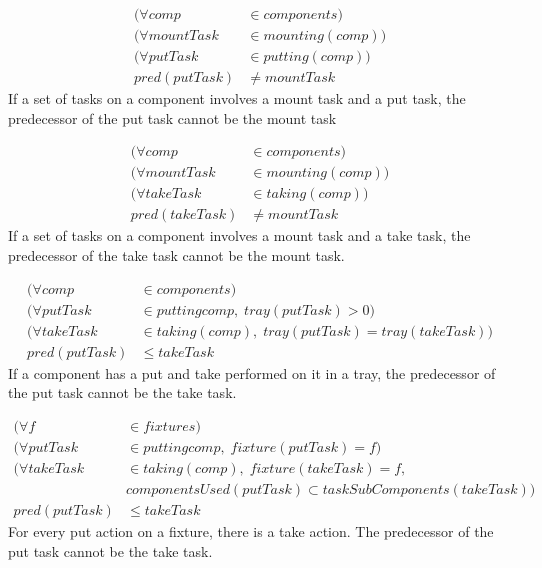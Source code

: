 
 \begin{equation}
 \begin{aligned}\label{eq:84}
 (\forall comp &\in components) \\
 (\forall mountTask &\in mounting(comp)) \\
 (\forall putTask &\in putting(comp)) \\
 pred(putTask) &\neq mountTask
 \end{aligned}
 \end{equation}
 If a set of tasks on a component involves a mount task and a put task, the predecessor of the put task cannot be the mount task
 
 
 \begin{equation}
 \begin{aligned}\label{eq:85}
 (\forall comp &\in components) \\
 (\forall mountTask &\in mounting(comp)) \\
 (\forall takeTask &\in taking(comp)) \\
 pred(takeTask) &\neq mountTask
 \end{aligned}
 \end{equation}
 If a set of tasks on a component involves a mount task and a take task, the predecessor of the take task cannot be the mount task.
 
 
 \begin{equation}
 \begin{aligned}\label{eq:86}
 (\forall comp &\in components) \\
 (\forall putTask &\in putting{comp}, \; tray(putTask) > 0) \\
 (\forall takeTask &\in taking(comp), \; tray(putTask) = tray(takeTask)) \\
 pred(putTask) &\le takeTask
 \end{aligned}
 \end{equation}
 If a component has a put and take performed on it in a tray, the predecessor of the put task cannot be the take task.
 
 
 \begin{equation}
 \begin{aligned}\label{eq:87}
 (\forall f &\in fixtures) \\
 (\forall putTask &\in putting{comp}, \; fixture(putTask) = f) \\
 (\forall takeTask &\in taking(comp), \; fixture(takeTask) = f,\\
 &componentsUsed(putTask) \subset taskSubComponents(takeTask))\\
 pred(putTask) &\le takeTask
 \end{aligned}
 \end{equation}
 For every put action on a fixture, there is a take action. The predecessor of the put task cannot be the take task.
 
